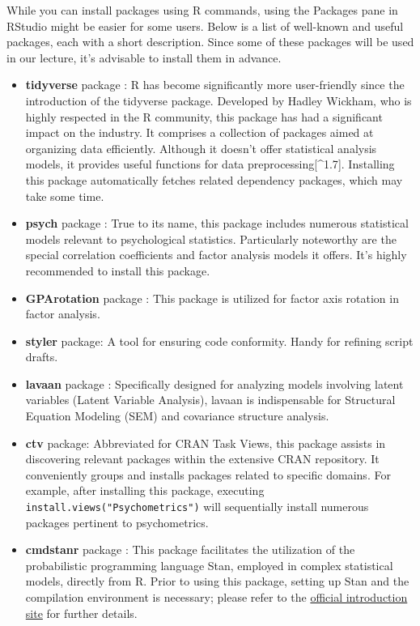 \documentclass[
  a4paper,
]{book}
\begin{document}
While you can install packages using R commands, using the Packages pane
in RStudio might be easier for some users. Below is a list of well-known
and useful packages, each with a short description. Since some of these
packages will be used in our lecture, it's advisable to install them in
advance.

\begin{itemize}
\item
  \textbf{tidyverse} package \autocite{tidyverse}: R has become
  significantly more user-friendly since the introduction of the
  tidyverse package. Developed by Hadley Wickham, who is highly
  respected in the R community, this package has had a significant
  impact on the industry. It comprises a collection of packages aimed at
  organizing data efficiently. Although it doesn't offer statistical
  analysis models, it provides useful functions for data
  preprocessing{[}\^{}1.7{]}. Installing this package automatically
  fetches related dependency packages, which may take some time.
\item
  \textbf{psych} package \autocite{psych}: True to its name, this
  package includes numerous statistical models relevant to psychological
  statistics. Particularly noteworthy are the special correlation
  coefficients and factor analysis models it offers. It's highly
  recommended to install this package.
\item
  \textbf{GPArotation} package \autocite{GPArotation}: This package is
  utilized for factor axis rotation in factor analysis.
\item
  \textbf{styler} package: A tool for ensuring code conformity. Handy
  for refining script drafts.
\item
  \textbf{lavaan} package \autocite{lavaan}: Specifically designed for
  analyzing models involving latent variables (Latent Variable
  Analysis), lavaan is indispensable for Structural Equation Modeling
  (SEM) and covariance structure analysis.
\item
  \textbf{ctv} package\autocite{CTV}: Abbreviated for CRAN Task Views,
  this package assists in discovering relevant packages within the
  extensive CRAN repository. It conveniently groups and installs
  packages related to specific domains. For example, after installing
  this package, executing \texttt{install.views("Psychometrics")} will
  sequentially install numerous packages pertinent to psychometrics.
\item
  \textbf{cmdstanr} package \autocite{cmdstanr}: This package
  facilitates the utilization of the probabilistic programming language
  Stan, employed in complex statistical models, directly from R. Prior
  to using this package, setting up Stan and the compilation environment
  is necessary; please refer to the
  \href{https://mc-stan.org/cmdstanr/articles/cmdstanr.html}{official
  introduction site} for further details.
\end{itemize}
\end{document}
